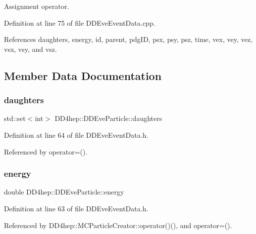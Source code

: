 Assignment operator. 



Definition at line 75 of file D\+D\+Eve\+Event\+Data.\+cpp.



References daughters, energy, id, parent, pdg\+ID, psx, psy, psz, time, vex, vey, vez, vsx, vsy, and vsz.



\subsection{Member Data Documentation}
\hypertarget{class_d_d4hep_1_1_d_d_eve_particle_a6cd73e254f4338306c06c54e1a9f2843}{}\label{class_d_d4hep_1_1_d_d_eve_particle_a6cd73e254f4338306c06c54e1a9f2843} 
\subsubsection{\texorpdfstring{daughters}{daughters}}
{\footnotesize\ttfamily std\+::set$<$int$>$ D\+D4hep\+::\+D\+D\+Eve\+Particle\+::daughters}



Definition at line 64 of file D\+D\+Eve\+Event\+Data.\+h.



Referenced by operator=().

\hypertarget{class_d_d4hep_1_1_d_d_eve_particle_ac874addd7f825b87415e65722860743d}{}\label{class_d_d4hep_1_1_d_d_eve_particle_ac874addd7f825b87415e65722860743d} 
\subsubsection{\texorpdfstring{energy}{energy}}
{\footnotesize\ttfamily double D\+D4hep\+::\+D\+D\+Eve\+Particle\+::energy}



Definition at line 63 of file D\+D\+Eve\+Event\+Data.\+h.



Referenced by D\+D4hep\+::\+M\+C\+Particle\+Creator\+::operator()(), and operator=().

\hypertarget{class_d_d4hep_1_1_d_d_eve_particle_a230cb6bfdbe03751bc0d2b84da8d32b3}{}\label{class_d_d4hep_1_1_d_d_eve_particle_a230cb6bfdbe03751bc0d2b84da8d32b3} 
